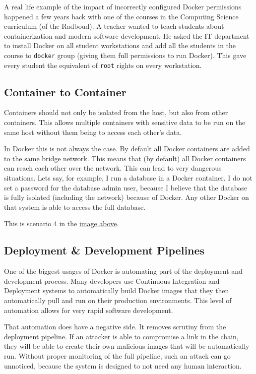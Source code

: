 \hfill

A real life example of the impact of incorrectly configured Docker permissions happened a few years back with one of the courses in the Computing Science curriculum (of the Radboud). A teacher wanted to teach students about containerization and modern software development. He asked the IT department to install Docker on all student workstations and add all the students in the course to \lstinline{docker} group (giving them full permissions to run Docker). This gave every student the equivalent of \lstinline{root} rights on every workstation.

\subsection{Container to Container}
Containers should not only be isolated from the host, but also from other containers. This allows multiple containers with sensitive data to be run on the same host without them being to access each other's data.

In Docker this is not always the case. By default all Docker containers are added to the same bridge network. This means that (by default) all Docker containers can reach each other over the network. This can lead to very dangerous situations. Lets say, for example, I run a database in a Docker container. I do not set a password for the database admin user, because I believe that the database is fully isolated (including the network) because of Docker. Any other Docker on that system is able to access the full database.

This is scenario 4 in the \href{fig:attacksurfaces}{image above}.

\subsection{Deployment \& Development Pipelines}
One of the biggest usages of Docker is automating part of the deployment and development process. Many developers use Continuous Integration and Deployment systems to automatically build Docker images that they then automatically pull and run on their production environments. This level of automation allows for very rapid software development.

That automation does have a negative side. It removes scrutiny from the deployment pipeline. If an attacker is able to compromise a link in the chain, they will be able to create their own malicious images that will be automatically run. Without proper monitoring of the full pipeline, such an attack can go unnoticed, because the system is designed to not need any human interaction.

